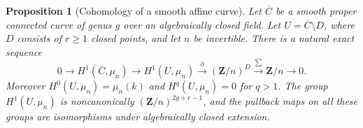 \documentclass[11pt,a4paper]{article}
\numberwithin{equation}{section}
\newtheorem{proposition}[theorem]{Proposition}
\theoremstyle{definition}
\theoremstyle{remark}
\newcommand{\Z}{\mathbf Z}
\begin{document}
\begin{proposition}[Cohomology of a smooth affine curve]
\label{app:curve-affine-kummer}
Let $\overline C$ be a smooth proper connected curve of genus $g$
over an algebraically closed field.  Let
$U=\overline C\setminus D$, where $D$ consists of $r\geq1$ closed
points, and let $n$ be invertible.  There is a natural exact sequence
\begin{equation}
 0\longrightarrow H^1(\overline C,\mu_n)
 \longrightarrow H^1(U,\mu_n)
 \xrightarrow{\partial}(\Z/n)^D
 \xrightarrow{\sum}\Z/n\longrightarrow0.
 \label{app:curve-residue-sequence}
\end{equation}
Moreover $H^0(U,\mu_n)=\mu_n(k)$ and $H^q(U,\mu_n)=0$ for $q>1$.
The group $H^1(U,\mu_n)$ is noncanonically $(\Z/n)^{2g+r-1}$, and
the pullback maps on all these groups are isomorphisms under
algebraically closed extension.
\end{proposition}
\end{document}
